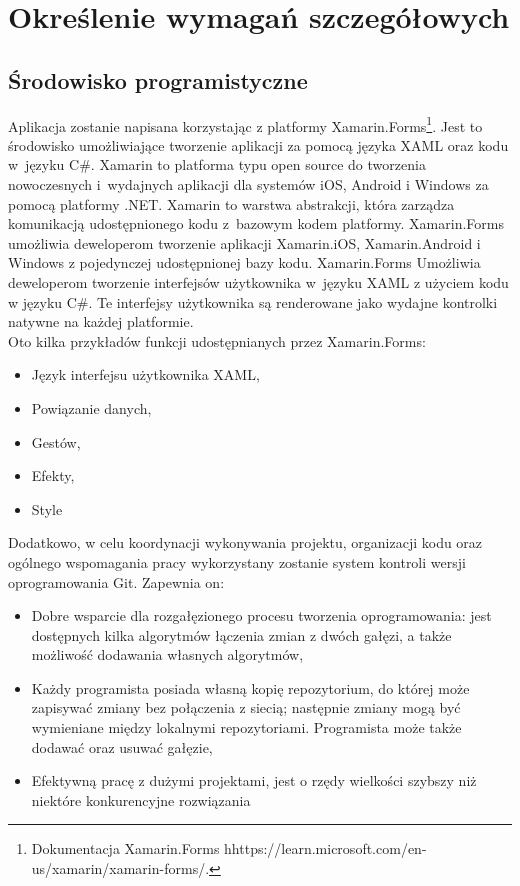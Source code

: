 \newpage
\section{Określenie wymagań szczegółowych}		%

\subsection{Środowisko programistyczne}  %

\hspace{0.60cm}Aplikacja zostanie napisana korzystając z platformy Xamarin.Forms\footnote{Dokumentacja Xamarin.Forms   hhttps://learn.microsoft.com/en-us/xamarin/xamarin-forms/\cite{www6}.}. Jest to środowisko umożliwiające tworzenie aplikacji za pomocą języka XAML oraz kodu w~języku C\#.
Xamarin to platforma typu open source do tworzenia nowoczesnych i~wydajnych aplikacji dla systemów iOS, Android i Windows za pomocą platformy .NET. Xamarin to warstwa abstrakcji, która zarządza komunikacją udostępnionego kodu z~bazowym kodem platformy. Xamarin.Forms umożliwia deweloperom tworzenie aplikacji Xamarin.iOS, Xamarin.Android i Windows z pojedynczej udostępnionej bazy kodu. Xamarin.Forms Umożliwia deweloperom tworzenie interfejsów użytkownika w~języku XAML z użyciem kodu w języku C\#. Te interfejsy użytkownika są renderowane jako wydajne kontrolki natywne na każdej platformie. \\ Oto kilka przykładów funkcji udostępnianych przez Xamarin.Forms:

\begin{itemize}
	\item Język interfejsu użytkownika XAML,
	\item Powiązanie danych,
	\item Gestów,
	\item Efekty,
	\item Style
\end{itemize}

Dodatkowo, w celu koordynacji wykonywania projektu, organizacji kodu oraz ogólnego wspomagania pracy wykorzystany zostanie system kontroli wersji oprogramowania Git. Zapewnia on:

\begin{itemize}
	\item Dobre wsparcie dla rozgałęzionego procesu tworzenia oprogramowania: jest dostępnych kilka algorytmów łączenia zmian z dwóch gałęzi, a także możliwość dodawania własnych algorytmów,
	\item Każdy programista posiada własną kopię repozytorium, do której może zapisywać zmiany bez połączenia z siecią; następnie zmiany mogą być wymieniane między lokalnymi repozytoriami. Programista może także dodawać oraz usuwać gałęzie, 
	\item Efektywną pracę z dużymi projektami, jest o rzędy wielkości szybszy niż niektóre konkurencyjne rozwiązania
\end{itemize}

